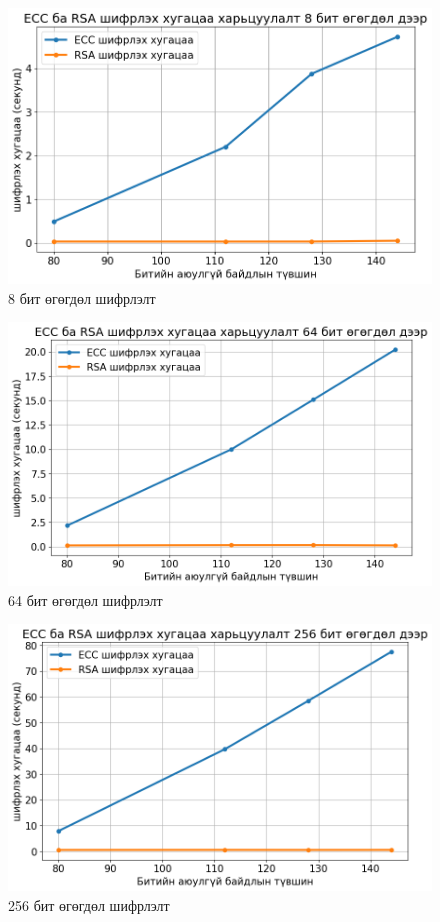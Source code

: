 \begin{figure}
	\centering
	\includegraphics[scale=0.65]{assets/graphs/1.png}
	\caption{8 бит өгөгдөл шифрлэлт}
	\label{fig:architecture}
\end{figure}
\begin{figure}
	\centering
	\includegraphics[scale=0.65]{assets/graphs/2.png}
	\caption{64 бит өгөгдөл шифрлэлт}
	\label{fig:architecture}
\end{figure}
\begin{figure}
	\centering
	\includegraphics[scale=0.65]{assets/graphs/3.png}
	\caption{256 бит өгөгдөл шифрлэлт}
	\label{fig:architecture}
\end{figure}
